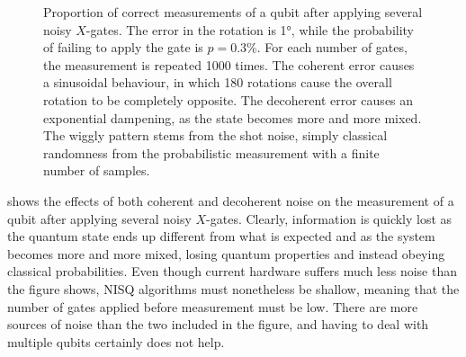 \begin{figure}
  \centering
  \caption[
    Effect of noise on the likelihood of correct measurement.
  ]
  {
    Proportion of correct measurements of a qubit after applying several noisy $X$-gates.
    The error in the rotation is \ang{1}, while the probability of failing to apply the gate is $p=0.3\%$.
    For each number of gates, the measurement is repeated 1000 times.
    The coherent error causes a sinusoidal behaviour, in which 180 rotations cause the overall rotation to be completely opposite.
    The decoherent error causes an exponential dampening, as the state becomes more and more mixed.
    The wiggly pattern stems from the shot noise, simply classical randomness from the probabilistic measurement with a finite number of samples.
  }
  \label{fig:noise_graph}
\end{figure}

 shows the effects of both coherent and decoherent noise on the measurement of a qubit after applying several noisy $X$-gates.
Clearly, information is quickly lost as the quantum state ends up different from what is expected and as the system becomes more and more mixed, losing quantum properties and instead obeying classical probabilities.
Even though current hardware suffers much less noise than the figure shows, NISQ algorithms must nonetheless be shallow, meaning that the number of gates applied before measurement must be low.
There are more sources of noise than the two included in the figure, and having to deal with multiple qubits certainly does not help.

